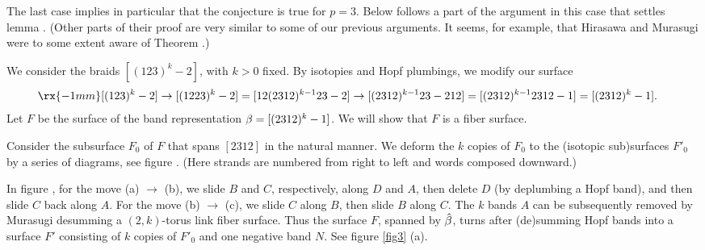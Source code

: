 \begin{appendix}
The last case implies in particular that the conjecture is
true for $p=3$. Below follows a part of the argument in this
case that settles lemma . (Other parts of their
proof are very similar to some of our previous arguments.
It seems, for example, that Hirasawa and Murasugi were to
some extent aware of Theorem .)

 We consider the braids $[(123)^k-2]$,
with $k>0$ fixed. By isotopies and Hopf plumbings, we modify our
surface 
\begin{eqnarray*}
&\rx{-1mm} [(123)^k -2] \to [(1223)^k - 2]=[12(2312)^{k-1}23 - 2] \to
[(2312)^{k-1}23 - 212] = [(2312)^{k-1}2312 -1]=[(2312)^k - 1].
\end{eqnarray*}
Let $F$ be the surface of the band representation $\beta=[(2312)^k-1]$.
We will show that $F$ is a fiber surface.

Consider the subsurface $F_0$ of $F$ that spans $[2 3 1 2]$
in the natural manner.
We deform the $k$ copies of $F_0$ to the (isotopic sub)surfaces
$F'_0$ by a series of diagrams, see figure .
(Here strands are numbered from right to left and words composed
downward.)

In figure , for the move (a) $\to$ (b), we slide
$B$ and $C$, respectively, along $D$ and $A$, then delete $D$
(by deplumbing a Hopf band), and then slide $C$ back along
$A$. For the move (b) $\to$ (c), we slide $C$ along $B$,
then slide $B$ along $C$. The $k$ bands $A$ can be subsequently
removed by Murasugi desumming a $(2,k)$-torus link fiber surface.
Thus the surface $F$, spanned by $\hat{\beta}$, turns after
(de)summing Hopf bands into a surface $F'$ consisting of $k$
copies of $F'_0$ and one negative band $N$. See figure \ref{fig3} (a).
 

{
\def\@captype{figure}
\long{}%
% 
% 

}
\end{appendix}

